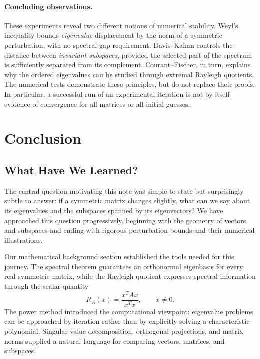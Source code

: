 \documentclass[14pt,letterpaper]{article}
\theoremstyle{plain}
\theoremstyle{definition}
\theoremstyle{remark}
\begin{document}
\paragraph{Concluding observations.}
These experiments reveal two different notions of
numerical stability. Weyl's inequality bounds
\emph{eigenvalue} displacement by the norm of a
symmetric perturbation, with no spectral-gap
requirement. Davis--Kahan controls the distance
between \emph{invariant subspaces}, provided the
selected part of the spectrum is sufficiently
separated from its complement. Courant--Fischer,
in turn, explains why the ordered eigenvalues can
be studied through extremal Rayleigh quotients.
The numerical tests demonstrate these principles,
but do not replace their proofs. In particular,
a successful run of an experimental iteration
is not by itself evidence of convergence for
all matrices or all initial guesses.




\section{Conclusion}
\label{sec:conclusion}

\subsection{What Have We Learned?}

The central question motivating this note was simple to
state but surprisingly subtle to answer: if a symmetric
matrix changes slightly, what can we say about its
eigenvalues and the subspaces spanned by its eigenvectors?
We have approached this question progressively, beginning
with the geometry of vectors and subspaces and ending with
rigorous perturbation bounds and their numerical
illustrations.

Our mathematical background section established the tools
needed for this journey. The spectral theorem guarantees
an orthonormal eigenbasis for every real symmetric matrix,
while the Rayleigh quotient expresses spectral information
through the scalar quantity
\[
R_A(x)=\frac{x^TAx}{x^Tx},\qquad x\neq0.
\]
The power method introduced the computational viewpoint:
eigenvalue problems can be approached by iteration rather
than by explicitly solving a characteristic polynomial.
Singular value decomposition, orthogonal projections, and
matrix norms supplied a natural language for comparing
vectors, matrices, and subspaces.
\end{document}
